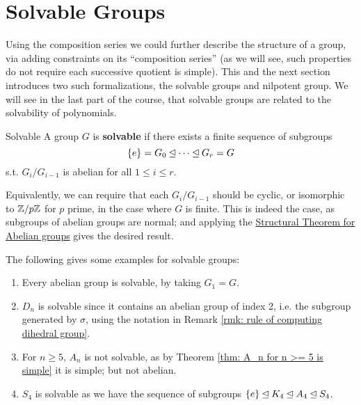 \documentclass{article}
\begin{document}
\section{Solvable Groups}

\textstart
Using the composition series we could further describe the structure of a group, via adding constraints on its ``composition series'' (as we will see, such properties do not require each successive quotient is simple). This and the next section introduces two such formalizations, the solvable groups and nilpotent group. We will see in the last part of the course, that solvable groups are related to the solvability of polynomials. 

\begin{definition}{Solvable}
    A group $G$ is \textbf{solvable} if there exists a finite sequence of subgroups
    \[
        \{e\} = G_0 \unlhd \cdots \unlhd G_r = G
    \]
    s.t. $G_i/G_{i-1}$ is abelian for all $1 \leq i \leq r$.
\end{definition}

\begin{remark}
    Equivalently, we can require that each $G_i/G_{i-1}$ should be cyclic, or isomorphic to $\mathbb{Z}/p\mathbb{Z}$ for $p$ prime, in the case where $G$ is finite. This is indeed the case, as subgroups of abelian groups are normal; and applying the \hyperref[thm: structural theorem]{Structural Theorem for Abelian groups} gives the desired result.
\end{remark}

\begin{example}
    The following gives some examples for solvable groups:
    \begin{enumerate}[label=\arabic*)]
        \item Every abelian group is solvable, by taking $G_1 = G$.
        \item $D_n$ is solvable since it contains an abelian group of index 2, i.e. the subgroup generated by $\sigma$, using the notation in Remark \ref{rmk: rule of computing dihedral group}.
        \item For $n \geq 5$, $A_n$ is not solvable, as by Theorem \ref{thm: A_n for n >= 5 is simple} it is simple; but not abelian.
        \item $S_4$ is solvable as we have the sequence of subgroups $\{e\} \unlhd K_4 \unlhd A_4 \unlhd S_4$.
    \end{enumerate}
\end{example}
\end{document}
